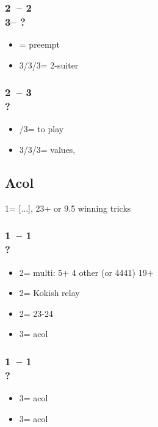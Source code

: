 \documentclass[12pt, a4paper]{report}
\begin{document}
\begin{bidpage}
\subsubsection*{2\clubs\ -- 2\nt\\
                3\clubs -- ?}
\begin{itemize}
    \item \pass = \clubs preempt
    \item 3\diams/3\hearts/3\spades = 2-suiter \qq
\end{itemize}
\end{bidpage}

\begin{bidpage}
\subsubsection*{2\clubs\ -- 3\clubs\\
                ?}
\begin{itemize}
    \item \pass/3\nt = to play
    \item 3\diams/3\hearts/3\spades = values, \fton{4\clubs}
\end{itemize}
\end{bidpage}

\begin{bidpage}
\section{Acol}

1\clubs = [...], 23+ \hcp or 9.5 winning tricks

\subsubsection*{1\clubs\ -- 1\diams\\
                ?}
\begin{itemize}
    \item 2\diams = multi: 5\clubs + 4 other (or 4441) 19+
    \item 2\hearts = Kokish relay
    \item 2\nt = 23-24 \bal
    \item 3\clubs = acol \diams
\end{itemize}
\end{bidpage}

\begin{bidpage}
\subsubsection*{1\clubs\ -- 1\hearts\\
                ?}
\begin{itemize}
    \item 3\clubs = acol \diams
    \item 3\diams = acol \spades
\end{itemize}
\end{bidpage}
\end{document}
